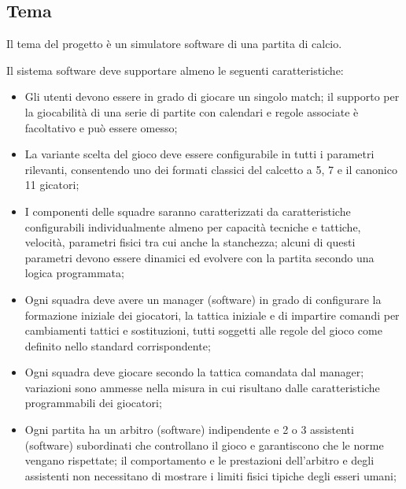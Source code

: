 \documentclass[aps,letterpaper,10pt]{article}
\begin{document}
\subsection{Tema}

Il tema del progetto \`e un simulatore software di una partita di calcio. \vspace{3mm}

Il sistema software deve supportare almeno le seguenti caratteristiche:
\begin{itemize}
\item Gli utenti devono essere in grado di giocare un singolo match; il supporto per la giocabilit\`a di una serie di
partite con calendari e regole associate \`e facoltativo e pu\`o essere omesso;
\item La variante scelta del gioco deve essere configurabile in tutti i parametri rilevanti, consentendo uno dei formati
classici del calcetto a 5, 7 e il canonico 11 gicatori;
\item I componenti delle squadre saranno caratterizzati da caratteristiche configurabili individualmente almeno per
capacit\`a tecniche e tattiche, velocit\`a, parametri fisici tra cui anche la stanchezza; alcuni di questi parametri
devono essere dinamici ed evolvere con la partita secondo una logica programmata;
\item Ogni squadra deve avere un manager (software) in grado di configurare la formazione iniziale dei giocatori, la
tattica iniziale e di impartire comandi per cambiamenti tattici e sostituzioni, tutti soggetti alle regole del gioco
come definito nello standard corrispondente;
\item Ogni squadra deve giocare secondo la tattica comandata dal manager; variazioni sono ammesse nella misura in cui
risultano dalle caratteristiche programmabili dei giocatori;
\item Ogni partita ha un arbitro (software) indipendente e 2 o 3 assistenti (software) subordinati che controllano il
gioco e garantiscono che le norme vengano rispettate; il comportamento e le prestazioni dell'arbitro e degli assistenti
non necessitano di mostrare i limiti fisici tipiche degli esseri umani;
\end{itemize}
\end{document}
